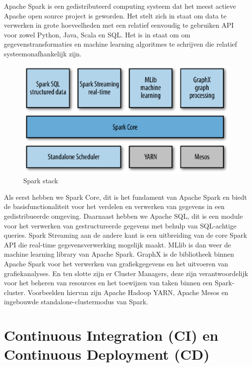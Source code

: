 Apache Spark is een gedistributeerd computing systeem dat het meest actieve Apache open source project is geworden. Het stelt zich in staat om data te verwerken in grote hoeveelheden met een relatief eenvoudig te gebruiken API voor zowel Python, Java, Scala en SQL. Het is in staat om om gegevenstransformaties en machine learning algoritmes te schrijven die relatief systeemonafhankelijk zijn.~\autocite{Karau2017}

\begin{figure}[H]
    \centering
    \includegraphics[width=1\textwidth]{./graphics/spark/spark-stack.png}
    \caption{Spark stack~\autocite{Karau2015}}
\end{figure}

Als eerst hebben we Spark Core, dit is het fundament van Apache Spark en biedt de basisfunctionaliteit voor het verdelen en verwerken van gegevens in een gedistribueerde omgeving. Daarnaast hebben we Apache SQL, dit is een module voor het verwerken van gestructureerde gegevens met behulp van SQL-achtige queries. Spark Streaming aan de andere kant is een uitbreiding van de core Spark API die real-time gegevensverwerking mogelijk maakt. MLlib is dan weer de machine learning library van Apache Spark. GraphX is de bibliotheek binnen Apache Spark voor het verwerken van grafiekgegevens en het uitvoeren van grafiekanalyses. En ten slotte zijn er Cluster Managers, deze zijn verantwoordelijk voor het beheren van resources en het toewijzen van taken binnen een Spark-cluster. Voorbeelden hiervan zijn Apache Hadoop YARN, Apache Mesos en ingebouwde standalone-clustermodus van Spark.~\autocite{Karau2015}

\section{Continuous Integration (CI) en Continuous Deployment (CD)}

